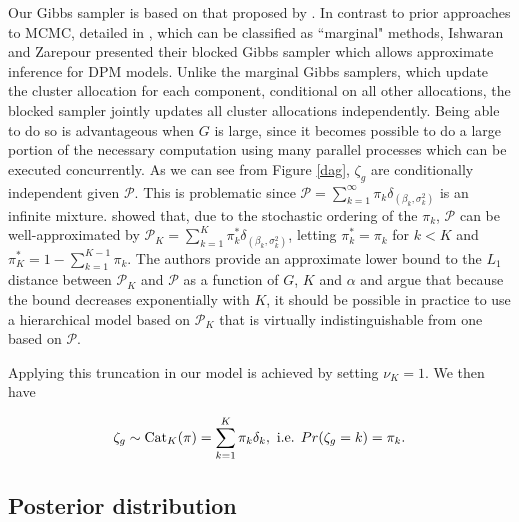 {Our Gibbs sampler is based on that proposed by \citet{ishwaran2000}. In contrast to prior approaches to MCMC, detailed in \citet{neal2000}, which can be classified as ``marginal" methods, Ishwaran and Zarepour presented their blocked Gibbs sampler which allows approximate inference for DPM models. Unlike the marginal Gibbs samplers, which update the cluster allocation for each component, conditional on all other allocations, the blocked sampler jointly updates all cluster allocations independently. Being able to do so is advantageous when $G$ is large, since it becomes possible to do a large portion of the necessary computation using many parallel processes which can be executed concurrently. As we can see from Figure \ref{dag}, $\zeta_g$ are conditionally independent given $\mathcal{P}$. This is problematic since $\mathcal{P}=\sum_{k=1}^\infty \pi_k \delta_{(\beta_k,\sigma^2_k)}$ is an infinite mixture. \cite{ishwaran2001} showed that, due to the stochastic ordering of the $\pi_k$, $\mathcal{P}$ can be well-approximated by $\mathcal{P}_K=\sum_{k=1}^K \pi^*_k \delta_{(\beta_k,\sigma^2_k)}$, letting $\pi_k^*=\pi_k$ for $k<K$ and $\pi_K^* = 1-\sum_{k=1}^{K-1} \pi_k$. The authors provide an approximate lower bound to the $L_1$ distance between $\mathcal{P}_K$ and $\mathcal{P}$ as a function of $G$, $K$ and $\alpha$ and argue that because the bound decreases exponentially with $K$, it should be possible in practice to use a hierarchical model based on $\mathcal{P}_K$ that is virtually indistinguishable from one based on $\mathcal{P}$.

Applying this truncation in our model is achieved by setting $\nu_K=1$. We then have

\begin{equation*}
\zeta_g \sim \operatorname{Cat}_K(\pi) = \sum_{k=1}^K \pi_k \delta_{k}, \mbox{ i.e. } Pr(\zeta_g=k)=\pi_k.
\end{equation*}



\subsection{Posterior distribution}
\label{subsec:posterior}


}
